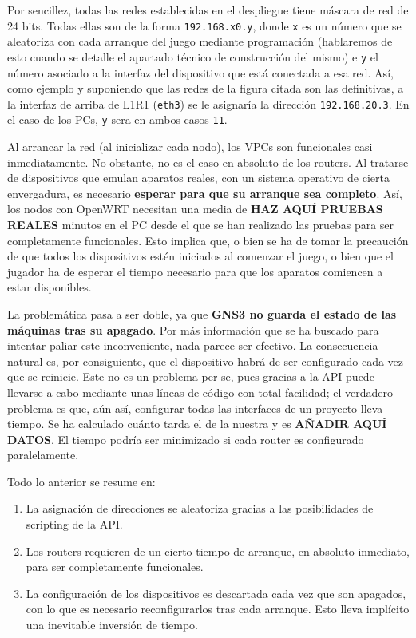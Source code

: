 Por sencillez, todas las redes establecidas en el despliegue tiene máscara de red de 24 bits. Todas ellas son de la forma \texttt{192.168.x0.y}, donde \texttt{x} es un número que se aleatoriza con cada arranque del juego mediante programación (hablaremos de esto cuando se detalle el apartado técnico de construcción del mismo) e \texttt{y} el número asociado a la interfaz del dispositivo que está conectada a esa red. Así, como ejemplo y suponiendo que las redes de la figura citada son las definitivas, a la interfaz de arriba de L1R1 (\texttt{eth3}) se le asignaría la dirección \texttt{192.168.20.3}. En el caso de los PCs, \texttt{y} sera en ambos casos \texttt{11}.

Al arrancar la red (al inicializar cada nodo), los VPCs son funcionales casi inmediatamente. No obstante, no es el caso en absoluto de los routers. Al tratarse de dispositivos que emulan aparatos reales, con un sistema operativo de cierta envergadura, es necesario \textbf{esperar para que su arranque sea completo}. Así, los nodos con OpenWRT necesitan una media de \textbf{HAZ AQUÍ PRUEBAS REALES} minutos en el PC desde el que se han realizado las pruebas para ser completamente funcionales. Esto implica que, o bien se ha de tomar la precaución de que todos los dispositivos estén iniciados al comenzar el juego, o bien que el jugador ha de esperar el tiempo necesario para que los aparatos comiencen a estar disponibles.

La problemática pasa a ser doble, ya que \textbf{GNS3 no guarda el estado de las máquinas tras su apagado}. Por más información que se ha buscado para intentar paliar este inconveniente, nada parece ser efectivo. La consecuencia natural es, por consiguiente, que el dispositivo habrá de ser configurado cada vez que se reinicie. Este no es un problema per se, pues gracias a la API puede llevarse a cabo mediante unas líneas de código con total facilidad; el verdadero problema es que, aún así, configurar todas las interfaces de un proyecto lleva tiempo. Se ha calculado cuánto tarda el de la nuestra y es \textbf{AÑADIR AQUÍ DATOS}. El tiempo podría ser minimizado si cada router es configurado paralelamente.

Todo lo anterior se resume en:
\begin{enumerate}
\item La asignación de direcciones se aleatoriza gracias a las posibilidades de scripting de la API.
\item Los routers requieren de un cierto tiempo de arranque, en absoluto inmediato, para ser completamente funcionales.
\item La configuración de los dispositivos es descartada cada vez que son apagados, con lo que es necesario reconfigurarlos tras cada arranque. Esto lleva implícito una inevitable inversión de tiempo.
\end{enumerate}

